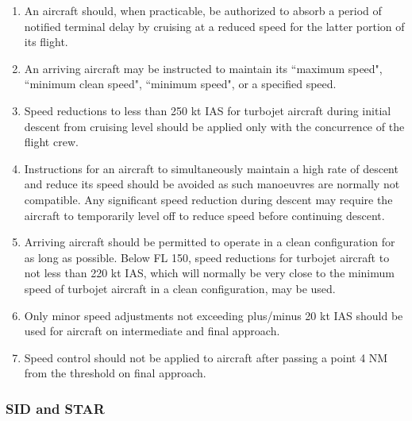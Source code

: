 \documentclass[../main.tex]{subfiles}
\begin{document}
    \begin{enumerate}
        \item An aircraft should, when practicable, be authorized to absorb a period of notified terminal delay by cruising at a reduced speed for the latter portion of its flight.
        \item An arriving aircraft may be instructed to maintain its ``maximum speed", ``minimum clean speed", ``minimum speed", or a specified speed.

        
        \item Speed reductions to less than 250 kt IAS for turbojet aircraft during initial descent from cruising level should be applied only with the concurrence of the flight crew.
        \item Instructions for an aircraft to simultaneously maintain a high rate of descent and reduce its speed should be avoided as such manoeuvres are normally not compatible. Any significant speed reduction during descent may require the aircraft to temporarily level off to reduce speed before continuing descent.
        \item Arriving aircraft should be permitted to operate in a clean configuration for as long as possible. Below FL 150, speed reductions for turbojet aircraft to not less than 220 kt IAS, which will normally be very close to the minimum speed of turbojet aircraft in a clean configuration, may be used.
        \item Only minor speed adjustments not exceeding plus/minus 20 kt IAS should be used for aircraft on intermediate and final approach.
        \item Speed control should not be applied to aircraft after passing a point 4 NM from the threshold on final approach.

    \end{enumerate}

    \subsubsection{SID and STAR}
\end{document}
